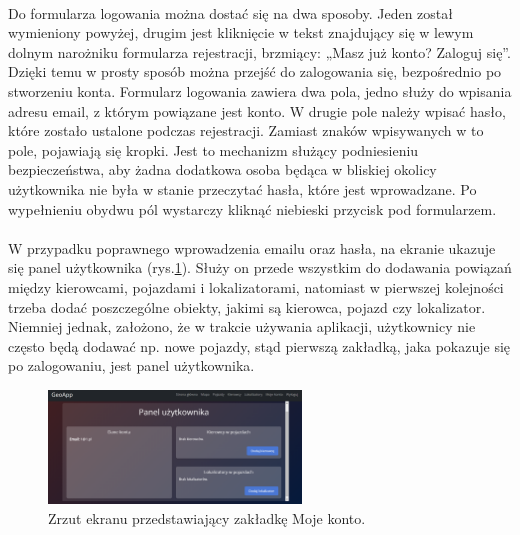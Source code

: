 \paragraph{}
Do formularza logowania można dostać się na dwa sposoby. Jeden został wymieniony powyżej, drugim jest kliknięcie w tekst znajdujący się w lewym dolnym narożniku formularza rejestracji, brzmiący: „Masz już konto? Zaloguj się”. Dzięki temu w prosty sposób można przejść do zalogowania się, bezpośrednio po stworzeniu konta. Formularz logowania zawiera dwa pola, jedno służy do wpisania adresu email, z którym powiązane jest konto. W drugie pole należy wpisać hasło, które zostało ustalone podczas rejestracji. Zamiast znaków wpisywanych w to pole, pojawiają się kropki. Jest to mechanizm służący podniesieniu bezpieczeństwa, aby żadna dodatkowa osoba będąca w bliskiej okolicy użytkownika nie była w stanie przeczytać hasła, które jest wprowadzane. Po wypełnieniu obydwu pól wystarczy kliknąć niebieski przycisk pod formularzem.

\paragraph{}
W przypadku poprawnego wprowadzenia emailu oraz hasła, na ekranie ukazuje się panel użytkownika (rys.\ref{fig:user_tab}). Służy on przede wszystkim do dodawania powiązań między kierowcami, pojazdami i lokalizatorami, natomiast w pierwszej kolejności trzeba dodać poszczególne obiekty, jakimi są kierowca, pojazd czy lokalizator. Niemniej jednak, założono, że w trakcie używania aplikacji, użytkownicy nie często będą dodawać np. nowe pojazdy, stąd pierwszą zakładką, jaka pokazuje się po zalogowaniu, jest panel użytkownika. 

\begin{figure}
	\centering
	\includegraphics[width=0.6\textwidth]{./graf/user_tab.png}
	\caption{Zrzut ekranu przedstawiający zakładkę Moje konto.}
	\label{fig:user_tab}
\end{figure}


